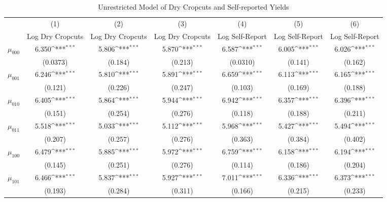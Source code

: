 \begin{table}[htbp]\centering
\def\sym#1{\ifmmode^{#1}\else\(^{#1}\)\fi}
\caption{Unrestricted Model of Dry Cropcuts and Self-reported Yields \label{tbl:unres}}
\begin{tabular}{l*{6}{c}}
\hline\hline
          &\multicolumn{1}{c}{(1)}&\multicolumn{1}{c}{(2)}&\multicolumn{1}{c}{(3)}&\multicolumn{1}{c}{(4)}&\multicolumn{1}{c}{(5)}&\multicolumn{1}{c}{(6)}\\
          &\multicolumn{1}{c}{Log Dry Cropcuts}&\multicolumn{1}{c}{Log Dry Cropcuts}&\multicolumn{1}{c}{Log Dry Cropcuts}&\multicolumn{1}{c}{Log Self-Report}&\multicolumn{1}{c}{Log Self-Report}&\multicolumn{1}{c}{Log Self-Report}\\
\hline
$\mu_{000}$&    6.350\sym{***}&    5.806\sym{***}&    5.870\sym{***}&    6.587\sym{***}&    6.005\sym{***}&    6.026\sym{***}\\
          & (0.0373)         &  (0.184)         &  (0.213)         & (0.0310)         &  (0.141)         &  (0.162)         \\
$\mu_{001}$&    6.246\sym{***}&    5.810\sym{***}&    5.891\sym{***}&    6.659\sym{***}&    6.113\sym{***}&    6.165\sym{***}\\
          &  (0.121)         &  (0.226)         &  (0.247)         &  (0.103)         &  (0.169)         &  (0.188)         \\
$\mu_{010}$&    6.405\sym{***}&    5.864\sym{***}&    5.944\sym{***}&    6.942\sym{***}&    6.357\sym{***}&    6.396\sym{***}\\
          &  (0.151)         &  (0.254)         &  (0.276)         &  (0.118)         &  (0.188)         &  (0.211)         \\
$\mu_{011}$&    5.518\sym{***}&    5.033\sym{***}&    5.112\sym{***}&    5.968\sym{***}&    5.427\sym{***}&    5.494\sym{***}\\
          &  (0.207)         &  (0.257)         &  (0.276)         &  (0.363)         &  (0.384)         &  (0.402)         \\
$\mu_{100}$&    6.479\sym{***}&    5.885\sym{***}&    5.972\sym{***}&    6.759\sym{***}&    6.158\sym{***}&    6.194\sym{***}\\
          &  (0.145)         &  (0.251)         &  (0.276)         &  (0.114)         &  (0.186)         &  (0.204)         \\
$\mu_{101}$&    6.466\sym{***}&    5.837\sym{***}&    5.927\sym{***}&    7.011\sym{***}&    6.336\sym{***}&    6.373\sym{***}\\
          &  (0.193)         &  (0.284)         &  (0.311)         &  (0.166)         &  (0.215)         &  (0.233)         \\

\end{tabular}
\end{table}
